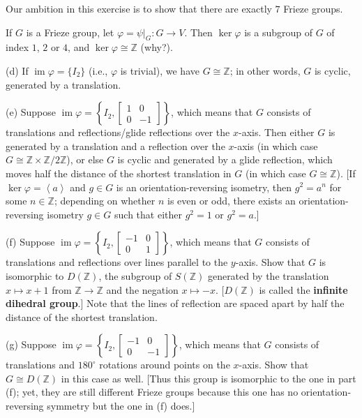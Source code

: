 \documentclass[leqno]{book}
\begin{document}
\begin{enumerate}
Our ambition in this exercise is to show that there are exactly $7$ Frieze groups.

If $G$ is a Frieze group, let $\varphi=\psi|_G:G\to V$.  Then $\ker\varphi$ is a subgroup of $G$ of index $1$, $2$ or $4$, and $\ker\varphi\cong\mathbb Z$ (why?).

(d) If $\operatorname{im}\varphi=\{I_2\}$ (i.e., $\varphi$ is trivial), we have $G\cong\mathbb Z$; in other words, $G$ is cyclic, generated by a translation.

(e) Suppose $\operatorname{im}\varphi=\left\{I_2,\begin{bmatrix}1&0\\0&-1\end{bmatrix}\right\}$, which means that $G$ consists of translations and reflections/glide reflections over the $x$-axis.  Then either $G$ is generated by a translation and a reflection over the $x$-axis (in which case $G\cong\mathbb Z\times\mathbb Z/2\mathbb Z$), or else $G$ is cyclic and generated by a glide reflection, which moves half the distance of the shortest translation in $G$ (in which case $G\cong\mathbb Z$).  [If $\ker\varphi=\left<a\right>$ and $g\in G$ is an orientation-reversing isometry, then $g^2=a^n$ for some $n\in\mathbb Z$; depending on whether $n$ is even or odd, there exists an orientation-reversing isometry $g\in G$ such that either $g^2=1$ or $g^2=a$.]

(f) Suppose $\operatorname{im}\varphi=\left\{I_2,\begin{bmatrix}-1&0\\0&1\end{bmatrix}\right\}$, which means that $G$ consists of translations and reflections over lines parallel to the $y$-axis.  Show that $G$ is isomorphic to $D(\mathbb Z)$, the subgroup of $S(\mathbb Z)$ generated by the translation $x\mapsto x+1$ from $\mathbb Z\to\mathbb Z$ and the negation $x\mapsto -x$.  [$D(\mathbb Z)$ is called the \textbf{infinite dihedral group}.]  Note that the lines of reflection are spaced apart by half the distance of the shortest translation.

(g) Suppose $\operatorname{im}\varphi=\left\{I_2,\begin{bmatrix}-1&0\\0&-1\end{bmatrix}\right\}$, which means that $G$ consists of translations and $180^\circ$ rotations around points on the $x$-axis.  Show that $G\cong D(\mathbb Z)$ in this case as well.  [Thus this group is isomorphic to the one in part (f); yet, they are still different Frieze groups because this one has no orientation-reversing symmetry but the one in (f) does.]


\end{enumerate}
\end{document}
